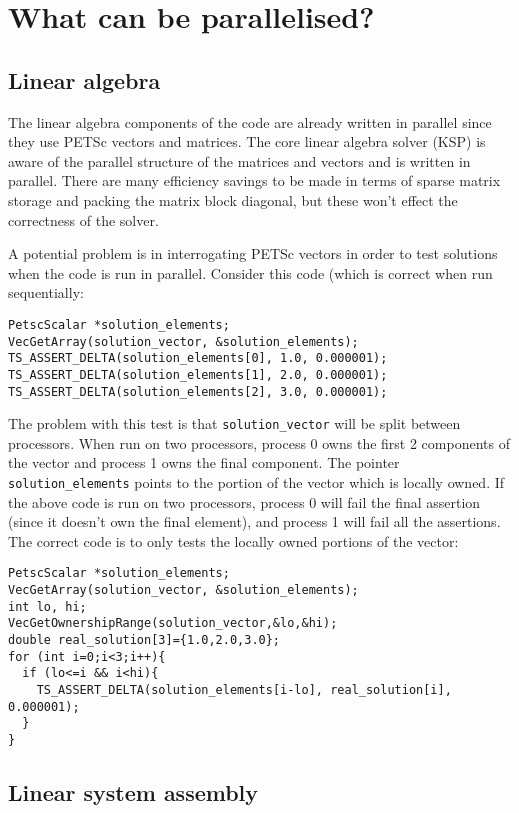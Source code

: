 \documentclass{article}
\begin{document}
\section{What can be parallelised?}

\subsection{Linear algebra}

The linear algebra components of the code are already written in
parallel since they use PETSc vectors and matrices.  The core linear
algebra solver (KSP) is aware of the parallel structure of the
matrices and vectors and is written in parallel.  There are many
efficiency savings to be made in terms of sparse matrix storage and
packing the matrix block diagonal, but these won't effect the
correctness of the solver.

A potential problem is in interrogating PETSc vectors in order to test
solutions when the code is run in parallel.  Consider this code (which
is correct when run sequentially:
\begin{verbatim}
PetscScalar *solution_elements;
VecGetArray(solution_vector, &solution_elements);
TS_ASSERT_DELTA(solution_elements[0], 1.0, 0.000001);
TS_ASSERT_DELTA(solution_elements[1], 2.0, 0.000001);
TS_ASSERT_DELTA(solution_elements[2], 3.0, 0.000001);
\end{verbatim}

The problem with this test is that {\tt solution\_vector} will be split
between processors.  When run on two processors, process 0 owns the
first 2 components of the vector and process 1 owns the final
component.  The pointer {\tt solution\_elements} points to the portion
of the vector which is locally owned.  If the above code is run on two
processors, process 0 will fail the final assertion (since it doesn't
own the final element), and process 1 will fail all the assertions.
The correct code is to only tests the locally owned portions of the vector:
\begin{verbatim}
PetscScalar *solution_elements;
VecGetArray(solution_vector, &solution_elements);
int lo, hi;
VecGetOwnershipRange(solution_vector,&lo,&hi);
double real_solution[3]={1.0,2.0,3.0};
for (int i=0;i<3;i++){
  if (lo<=i && i<hi){
    TS_ASSERT_DELTA(solution_elements[i-lo], real_solution[i], 0.000001);
  }
}
\end{verbatim}

\subsection{Linear system assembly}
\end{document}
